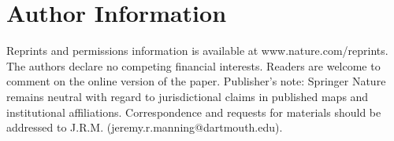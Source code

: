\documentclass[12pt]{article}
\begin{document}
\section*{Author Information}
Reprints and permissions information is available at www.nature.com/reprints.  The authors declare no competing financial interests.  Readers are welcome to comment on the online version of the paper.  Publisher's note: Springer Nature remains neutral with regard to jurisdictional claims in published maps and institutional affiliations.  Correspondence and requests for materials should be addressed to J.R.M.  (jeremy.r.manning@dartmouth.edu).




\clearpage
\end{document}
